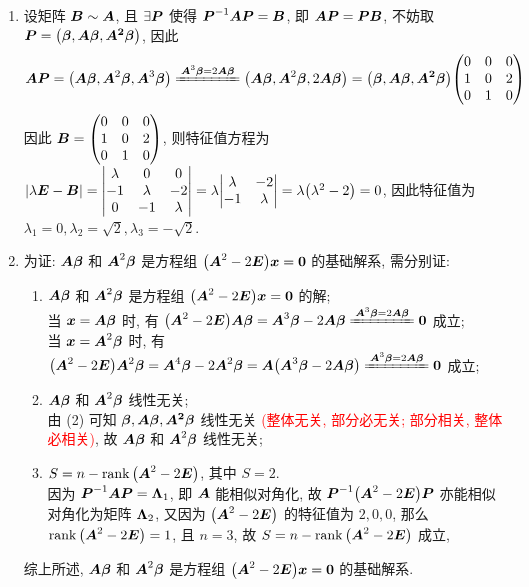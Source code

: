 \begin{solution}
\begin{enumerate}[label=(\arabic{*})]
        \item 设矩阵 $\vb*{B}\sim\vb*{A}$, 且 $\exists\vb*{P}$ 使得 $\vb*{P}^{-1}\vb*{AP}=\vb*{B}$, 即 $\vb*{AP}=\vb*{PB}$, 不妨取 $\vb*{P}=\qty(\vb*{\beta},\vb*{A\beta},\vb*{A^2\beta})$, 因此
              $$\vb*{AP}=\qty(\vb*{A\beta},\vb*{A}^2\vb*{\beta},\vb*{A}^3\vb*{\beta})\xlongequal{\vb*{A}^3\vb*{\beta}=2\vb*{A\beta}}\qty(\vb*{A\beta},\vb*{A}^2\vb*{\beta},2\vb*{A\beta})=\qty(\vb*{\beta},\vb*{A\beta},\vb*{A^2\beta})\mqty(0&0&0\\1&0&2\\0&1&0)$$
              因此 $\vb*{B}=\mqty(0&0&0\\1&0&2\\0&1&0)$, 则特征值方程为 $|\lambda\vb*{E}-\vb*{B}|=\mqty|\lambda &0&0\\-1&\lambda&-2\\0&-1&\lambda|=\lambda\mqty|\lambda&-2\\-1&\lambda|=\lambda\qty(\lambda^2-2)=0$, 因此特征值为 $\lambda_1=0,\lambda_2=\sqrt{2},\lambda_3=-\sqrt{2}$.
        \item 为证: $\vb*{A\beta}$ 和 $\vb*{A}^2\vb*{\beta}$ 是方程组 $\qty(\vb*{A}^2-2\vb*{E})\vb*{x}=\vb*{0}$ 的基础解系, 需分别证:
              \begin{enumerate}[label=(\roman{*})]
                  \item $\vb*{A\beta}$ 和 $\vb*{A}^2\vb*{\beta}$ 是方程组 $\qty(\vb*{A}^2-2\vb*{E})\vb*{x}=\vb*{0}$ 的解;\\
                        当 $\vb*{x}=\vb*{A\beta}$ 时, 有 $\qty(\vb*{A}^2-2\vb*{E})\vb*{A\beta}=\vb*{A}^3\vb*{\beta}-2\vb*{A\beta}\xlongequal{\vb*{A}^3\vb*{\beta}=2\vb*{A\beta}}\vb*{0}$ 成立;\\
                        当 $\vb*{x}=\vb*{A}^2\vb*{\beta}$ 时, 有 $\qty(\vb*{A}^2-2\vb*{E})\vb*{A}^2\vb*{\beta}=\vb*{A}^4\vb*{\beta}-2\vb*{A}^2\vb*{\beta}=\vb*{A}\qty(\vb*{A}^3\vb*{\beta}-2\vb*{A\beta})\xlongequal{\vb*{A}^3\vb*{\beta}=2\vb*{A\beta}}\vb*{0}$ 成立;
                  \item $\vb*{A\beta}$ 和 $\vb*{A}^2\vb*{\beta}$ 线性无关;\\
                        由 (2) 可知 $\vb*{\beta},\vb*{A\beta},\vb*{A^2\beta}$ 线性无关 \textcolor{red}{(整体无关, 部分必无关; 部分相关, 整体必相关)}, 故 $\vb*{A\beta}$ 和 $\vb*{A}^2\vb*{\beta}$ 线性无关;
                  \item $S=n-\rank\qty(\vb*{A}^2-2\vb*{E})$, 其中 $S=2$.\\
                        因为 $\vb*{P}^{-1}\vb*{AP}=\vb*{\Lambda}_1$, 即 $\vb*{A}$ 能相似对角化, 故 $\vb*{P}^{-1}\qty(\vb*{A}^2-2\vb*{E})\vb*{P}$ 亦能相似对角化为矩阵 $\vb*{\Lambda}_2$, 又因为 $\qty(\vb*{A}^2-2\vb*{E})$ 的特征值为 $2,0,0$, 那么 $\rank\qty(\vb*{A}^2-2\vb*{E})=1$, 且 $n=3$, 故 $S=n-\rank\qty(\vb*{A}^2-2\vb*{E})$ 成立, 
              \end{enumerate}
              综上所述, $\vb*{A\beta}$ 和 $\vb*{A}^2\vb*{\beta}$ 是方程组 $\qty(\vb*{A}^2-2\vb*{E})\vb*{x}=\vb*{0}$ 的基础解系.
    \end{enumerate}
\end{solution}
